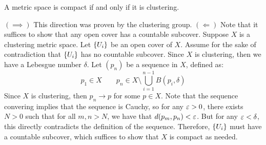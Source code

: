 \begin{thm}
    A metric space is compact if and only if it is clustering.
\end{thm}
\vspace{-0.2in}
\begin{pf}
    $ (\implies) $ This direction was proven by the clustering group. \vsp
    $ (\Longleftarrow) $ Note that it suffices to show that any open cover has a countable
    subcover. Suppose $ X $ is a clustering metric space. Let $ \left\{{U_{i}}\right\} $ be an open cover of
    $ X $. Assume for the sake of contradiction that $ \left\{{U_{i}}\right\} $ has no countable subcover.
    Since $ X $ is clustering, then we have a Lebesgue number $ \delta $. \vsp
    Let $ (p_{n}) $ be a sequence in $ X $, defined as:
    \begin{equation*}
        p_{1} \in X \qquad p_{n} \in X \setminus \bigcup_{i=1}^{n-1}B(p_{i}, \delta)
    \end{equation*}
    Since $ X $ is clustering, then $ p_{n} \rightarrow p $ for some $ p \in X $. Note that the
    sequence convering implies that the sequence is Cauchy, so for any $ \operatorname{\varepsilon} > 0 $, there exists
    $ N > 0 $ such that for all $ m, n > N $, we have that $ d(p_{m}, p_{n}) < \operatorname{\varepsilon} $. \vsp
    But for any $ \operatorname{\varepsilon} < \delta $, this directly contradicts the definition of the sequence.
    Therefore, $ \left\{{U_{i}}\right\} $ must have a countable subcover, which suffices to show that $ X $
    is compact as needed.
\end{pf}
